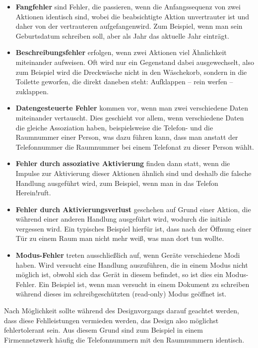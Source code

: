 \documentclass[parskip,headsepline, headtopline, %
footsepline, oneside, 12pt, headings=small]{scrreprt}
\begin{document}
\begin{itemize}
\item \textbf{Fangfehler} sind Fehler, die passieren, wenn die Anfangssequenz von zwei Aktionen identisch sind, wobei die beabsichtigte Aktion unvertrauter ist und daher von der vertrauteren \glqq aufgefangen\grqq wird. Zum Beispiel, wenn man sein Geburtsdatum schreiben soll, aber als Jahr das aktuelle Jahr einträgt.
\item \textbf{Beschreibungsfehler} erfolgen, wenn zwei Aktionen viel Ähnlichkeit miteinander aufweisen. Oft wird nur ein Gegenstand dabei ausgewechselt, also zum Beispiel wird die Dreckwäsche nicht in den Wäschekorb, sondern in die Toilette geworfen, die direkt daneben steht: Aufklappen -- rein werfen -- zuklappen.
\item \textbf{Datengesteuerte Fehler} kommen vor, wenn man zwei verschiedene Daten miteinander vertauscht. Dies geschieht vor allem, wenn verschiedene Daten die gleiche Assoziation haben, beispielsweise die Telefon- und die Raumnummer einer Person, was dazu führen kann, dass man anstatt der Telefonnummer die Raumnummer bei einem Telefonat zu dieser Person wählt.
\item \textbf{Fehler durch assoziative Aktivierung} finden dann statt, wenn die Impulse zur Aktivierung dieser Aktionen ähnlich sind und deshalb die falsche Handlung ausgeführt wird, zum Beispiel, wenn man in das Telefon \glqq Herein!\grqq  ruft.
\item \textbf{Fehler durch Aktivierungsverlust} geschehen auf Grund einer Aktion, die während einer anderen Handlung ausgeführt wird, wodurch die initiale vergessen wird. Ein typisches Beispiel hierfür ist, dass nach der Öffnung einer Tür zu einem Raum man nicht mehr weiß, was man dort tun wollte.
\item \textbf{Modus-Fehler} treten ausschließlich auf, wenn Geräte verschiedene Modi haben. Wird versucht eine Handlung auszuführen, die in einem Modus nicht möglich ist, obwohl sich das Gerät in diesem befindet, so ist dies ein Modus-Fehler. Ein Beispiel ist, wenn man versucht in einem Dokument zu schreiben während dieses im schreibgeschützten (read-only) Modus geöffnet ist.
\end{itemize}

Nach Möglichkeit sollte während des Designvorgangs darauf geachtet werden, dass diese Fehlleistungen vermieden werden, das Design also möglichst fehlertolerant sein. Aus diesem Grund sind zum Beispiel in einem Firmennetzwerk häufig die Telefonnummern mit den Raumnummern identisch.
\end{document}

